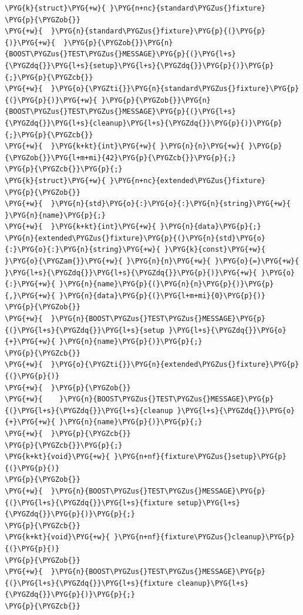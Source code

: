 \begin{codeblockbg}
\begin{Verbatim}[commandchars=\\\{\},breaklines=true,breakanywhere=true,fontsize=\codefont,xleftmargin=17bp]
\PYG{k}{struct}\PYG{+w}{ }\PYG{n+nc}{standard\PYGZus{}fixture}
\PYG{p}{\PYGZob{}}
\PYG{+w}{  }\PYG{n}{standard\PYGZus{}fixture}\PYG{p}{(}\PYG{p}{)}\PYG{+w}{  }\PYG{p}{\PYGZob{}}\PYG{n}{BOOST\PYGZus{}TEST\PYGZus{}MESSAGE}\PYG{p}{(}\PYG{l+s}{\PYGZdq{}}\PYG{l+s}{setup}\PYG{l+s}{\PYGZdq{}}\PYG{p}{)}\PYG{p}{;}\PYG{p}{\PYGZcb{}}
\PYG{+w}{  }\PYG{o}{\PYGZti{}}\PYG{n}{standard\PYGZus{}fixture}\PYG{p}{(}\PYG{p}{)}\PYG{+w}{ }\PYG{p}{\PYGZob{}}\PYG{n}{BOOST\PYGZus{}TEST\PYGZus{}MESSAGE}\PYG{p}{(}\PYG{l+s}{\PYGZdq{}}\PYG{l+s}{cleanup}\PYG{l+s}{\PYGZdq{}}\PYG{p}{)}\PYG{p}{;}\PYG{p}{\PYGZcb{}}
\PYG{+w}{  }\PYG{k+kt}{int}\PYG{+w}{ }\PYG{n}{n}\PYG{+w}{ }\PYG{p}{\PYGZob{}}\PYG{l+m+mi}{42}\PYG{p}{\PYGZcb{}}\PYG{p}{;}
\PYG{p}{\PYGZcb{}}\PYG{p}{;}
\PYG{k}{struct}\PYG{+w}{ }\PYG{n+nc}{extended\PYGZus{}fixture}
\PYG{p}{\PYGZob{}}
\PYG{+w}{  }\PYG{n}{std}\PYG{o}{:}\PYG{o}{:}\PYG{n}{string}\PYG{+w}{ }\PYG{n}{name}\PYG{p}{;}
\PYG{+w}{  }\PYG{k+kt}{int}\PYG{+w}{ }\PYG{n}{data}\PYG{p}{;}
\PYG{n}{extended\PYGZus{}fixture}\PYG{p}{(}\PYG{n}{std}\PYG{o}{:}\PYG{o}{:}\PYG{n}{string}\PYG{+w}{ }\PYG{k}{const}\PYG{+w}{ }\PYG{o}{\PYGZam{}}\PYG{+w}{ }\PYG{n}{n}\PYG{+w}{ }\PYG{o}{=}\PYG{+w}{ }\PYG{l+s}{\PYGZdq{}}\PYG{l+s}{\PYGZdq{}}\PYG{p}{)}\PYG{+w}{ }\PYG{o}{:}\PYG{+w}{ }\PYG{n}{name}\PYG{p}{(}\PYG{n}{n}\PYG{p}{)}\PYG{p}{,}\PYG{+w}{ }\PYG{n}{data}\PYG{p}{(}\PYG{l+m+mi}{0}\PYG{p}{)}
\PYG{p}{\PYGZob{}}
\PYG{+w}{  }\PYG{n}{BOOST\PYGZus{}TEST\PYGZus{}MESSAGE}\PYG{p}{(}\PYG{l+s}{\PYGZdq{}}\PYG{l+s}{setup }\PYG{l+s}{\PYGZdq{}}\PYG{o}{+}\PYG{+w}{ }\PYG{n}{name}\PYG{p}{)}\PYG{p}{;}
\PYG{p}{\PYGZcb{}}
\PYG{+w}{  }\PYG{o}{\PYGZti{}}\PYG{n}{extended\PYGZus{}fixture}\PYG{p}{(}\PYG{p}{)}
\PYG{+w}{  }\PYG{p}{\PYGZob{}}
\PYG{+w}{    }\PYG{n}{BOOST\PYGZus{}TEST\PYGZus{}MESSAGE}\PYG{p}{(}\PYG{l+s}{\PYGZdq{}}\PYG{l+s}{cleanup }\PYG{l+s}{\PYGZdq{}}\PYG{o}{+}\PYG{+w}{ }\PYG{n}{name}\PYG{p}{)}\PYG{p}{;}
\PYG{+w}{  }\PYG{p}{\PYGZcb{}}
\PYG{p}{\PYGZcb{}}\PYG{p}{;}
\PYG{k+kt}{void}\PYG{+w}{ }\PYG{n+nf}{fixture\PYGZus{}setup}\PYG{p}{(}\PYG{p}{)}
\PYG{p}{\PYGZob{}}
\PYG{+w}{  }\PYG{n}{BOOST\PYGZus{}TEST\PYGZus{}MESSAGE}\PYG{p}{(}\PYG{l+s}{\PYGZdq{}}\PYG{l+s}{fixture setup}\PYG{l+s}{\PYGZdq{}}\PYG{p}{)}\PYG{p}{;}
\PYG{p}{\PYGZcb{}}
\PYG{k+kt}{void}\PYG{+w}{ }\PYG{n+nf}{fixture\PYGZus{}cleanup}\PYG{p}{(}\PYG{p}{)}
\PYG{p}{\PYGZob{}}
\PYG{+w}{  }\PYG{n}{BOOST\PYGZus{}TEST\PYGZus{}MESSAGE}\PYG{p}{(}\PYG{l+s}{\PYGZdq{}}\PYG{l+s}{fixture cleanup}\PYG{l+s}{\PYGZdq{}}\PYG{p}{)}\PYG{p}{;}
\PYG{p}{\PYGZcb{}}
\end{Verbatim}
\end{codeblockbg}


